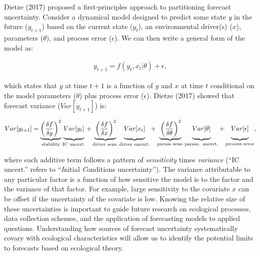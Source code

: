 \documentclass[12pt,]{article}
\begin{document}
Dietze (2017) proposed a first-principles approach to partitioning
forecast uncertainty. Consider a dynamical model designed to predict
some state \emph{y} in the future (\(y_{t+1}\)) based on the current
state (\(y_{t}\)), an environmental driver(s) (\(x\)), parameters
(\(\theta\)), and process error (\(\epsilon\)). We can then write a
general form of the model as: \vspace{-2em}

\begin{align}
y_{t+1} = f(y_t, x_t|\theta) + \epsilon,
\end{align}\vspace{-2em}

which states that \(y\) at time \(t+1\) is a function of \(y\) and \(x\)
at time \(t\) conditional on the model parameters (\(\theta\)) plus
process error (\(\epsilon\)).
Dietze (2017) showed that forecast variance (\(Var[y_{t+1}]\)) is:
\vspace{-1em}

\begin{align}
Var[y_{t+1}] = \underbrace{\left(\frac{\delta f}{\delta y} \right)^2}_{\text{stability}} 
               \underbrace{\vphantom{ \left(\frac{\delta f}{\delta y} \right)^2 } Var[y_t]}_{\text{IC uncert.}} +
               \underbrace{\vphantom{ \left(\frac{\delta f}{\delta y} \right)^2 }\left(\frac{\delta f}{\delta x} \right)^2}_{\text{driver sens.}} 
               \underbrace{\vphantom{ \left(\frac{\delta f}{\delta y} \right)^2 } Var[x_t]}_{\text{driver uncert.}} +
               \underbrace{\vphantom{ \left(\frac{\delta f}{\delta y} \right)^2 }\left(\frac{\delta f}{\delta \theta} \right)^2}_{\text{param sens.}}
               \underbrace{\vphantom{ \left(\frac{\delta f}{\delta y} \right)^2 } Var[\theta]}_{\text{param. uncert.}} +
               \underbrace{\vphantom{ \left(\frac{\delta f}{\delta y} \right)^2 } Var[\epsilon]}_{\text{process error}},
\end{align}\vspace{-1em}

where each additive term follows a pattern of \emph{sensitivity} times
\emph{variance} (``IC uncert.'' refers to ``\emph{I}nitial
\emph{C}onditions uncertainty''). The variance attributable to any
particular factor is a function of how sensitive the model is to the
factor and the variance of that factor. For example, large sensitivity
to the covariate \(x\) can be offset if the uncertainty of the covariate
is low. Knowing the relative size of these uncertainties is important to
guide future research on ecological processes, data collection schemes,
and the application of forecasting models to applied questions. 
Understanding how sources of forecast uncertainty
systematically covary with ecological characteristics will allow us to
identify the potential limits to forecasts based on ecological theory.
\end{document}
